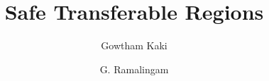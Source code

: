 \documentclass[a4paper,UKenglish]{lipics-v2018}
\title{Safe Transferable Regions}
\author{Gowtham Kaki}
       {Purdue University, USA\footnote{Work done during an internship at
Microsoft Research, India.}}
       {gkaki@purdue.edu}
       {}
       {}%
\author{G. Ramalingam}
       {Microsoft Research, India}
       {grama@microsoft.com}
       {}
       {}%
\begin{document}
\maketitle

\begin{abstract}

\end{abstract}







\renewcommand{\rgn}{\pi}


\renewcommand{\rgn}{r}







\clearpage


\appendix




\renewcommand{\rgn}{\myownthrowexception}



\end{document}
